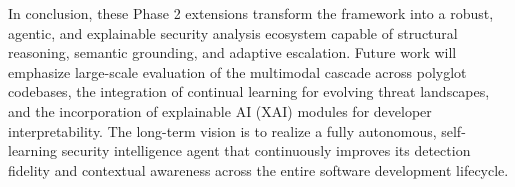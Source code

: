 In conclusion, these Phase 2 extensions transform the framework into a robust, agentic, and explainable security analysis ecosystem capable of structural reasoning, semantic grounding, and adaptive escalation. Future work will emphasize large-scale evaluation of the multimodal cascade across polyglot codebases, the integration of continual learning for evolving threat landscapes, and the incorporation of explainable AI (XAI) modules for developer interpretability. The long-term vision is to realize a fully autonomous, self-learning security intelligence agent that continuously improves its detection fidelity and contextual awareness across the entire software development lifecycle.

